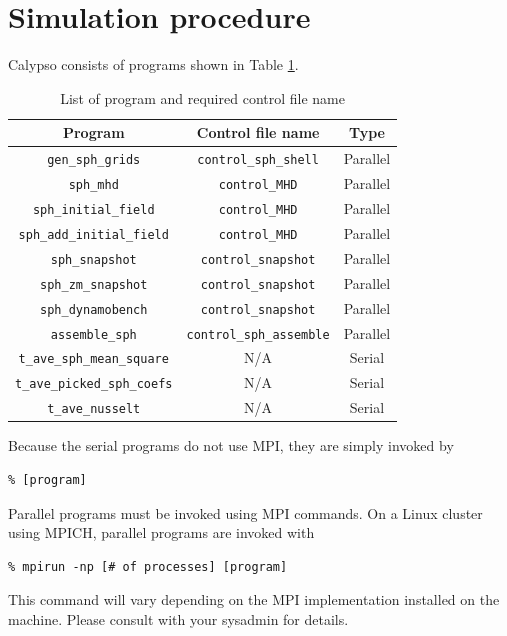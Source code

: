 \section{Simulation procedure}
Calypso consists of programs shown in Table \ref{table:controls}.
%
\begin{table}[htdp]
\caption{List of program and required control file name}
\begin{center}
\begin{tabular}{|c|c|c|}
\hline
Program & Control file name & Type \\ \hline
\verb|gen_sph_grids|          & \verb|control_sph_shell| &  Parallel    \\
\verb|sph_mhd|                & \verb|control_MHD| &        Parallel  \\ \hline
\verb|sph_initial_field|      & \verb|control_MHD| &        Parallel  \\
\verb|sph_add_initial_field|  & \verb|control_MHD| &        Parallel  \\
\verb|sph_snapshot|           & \verb|control_snapshot| &   Parallel  \\ \hline
\verb|sph_zm_snapshot|        & \verb|control_snapshot| &   Parallel  \\
\verb|sph_dynamobench|        & \verb|control_snapshot| &   Parallel  \\ \hline
\verb|assemble_sph|           & \verb|control_sph_assemble| & Parallel  \\ \hline
\verb|t_ave_sph_mean_square|  & N/A & Serial  \\ \hline
\verb|t_ave_picked_sph_coefs| & N/A & Serial  \\ \hline
\verb|t_ave_nusselt|          & N/A & Serial  \\ \hline
\end{tabular}
\end{center}
\label{table:controls}
\end{table}
%
Because the serial programs do not use MPI, they are simply invoked by
%
\begin{verbatim}
% [program]
\end{verbatim}
%
Parallel programs must be invoked using MPI commands. On a Linux cluster using MPICH, parallel programs are invoked with 
%
\begin{verbatim}
% mpirun -np [# of processes] [program]
\end{verbatim}
%

This command will vary depending on the MPI implementation installed on the machine.  Please consult with your sysadmin for details.

